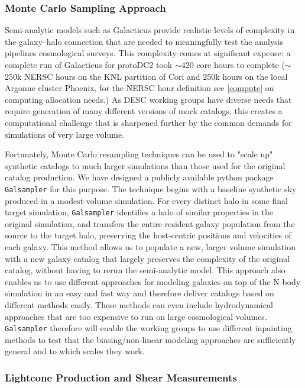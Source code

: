 \documentclass[preprint,times]{aastex61}
\begin{document}
\subsubsection{Monte Carlo Sampling Approach}
Semi-analytic models such as Galacticus provide realistic levels of complexity in the galaxy--halo connection that are needed to meaningfully test the analysis pipelines cosmological surveys. This complexity comes at significant expense: a complete run of Galacticus for protoDC2 took $\sim 420$ core hours to complete ($\sim$ 250k NERSC hours on the KNL partition of Cori and 250k hours on the local Argonne cluster Phoenix, for the NERSC hour definition see \autoref{compute} on computing allocation needs.) As DESC working groups have diverse needs that require generation of many different versions of mock catalogs, this creates a computational challenge that is sharpened further by the common demands for simulations of very large volume.

Fortunately, Monte Carlo resampling techniques can be used to "scale up" synthetic catalogs to much larger simulations than those used for the original catalog production. We have designed a publicly available python package {\tt Galsampler} for this purpose. The technique begins with a baseline synthetic sky produced in a modest-volume simulation. For every distinct halo in some final target simulation, {\tt Galsampler} identifies a halo of similar properties in the original simulation, and transfers the entire resident galaxy population from the source to the target halo, preserving the host-centric positions and velocities of each galaxy. This method allows us to populate a new, larger volume simulation with a new galaxy catalog that largely preserves the complexity of the original catalog, without having to rerun the semi-analytic model. This approach also enables us to use different approaches for modeling galaxies on top of the N-body simulation in an easy and fast way and therefore deliver catalogs based on different methods easily. These methods can even include hydrodynamical approaches that are too expensive to run on large cosmological volumes. {\tt Galsampler} therefore will enable the working groups to use different inpainting methods to test that the biasing/non-linear modeling approaches are sufficiently general and to which scales they work. 

\subsubsection{Lightcone Production and Shear Measurements}
\end{document}

